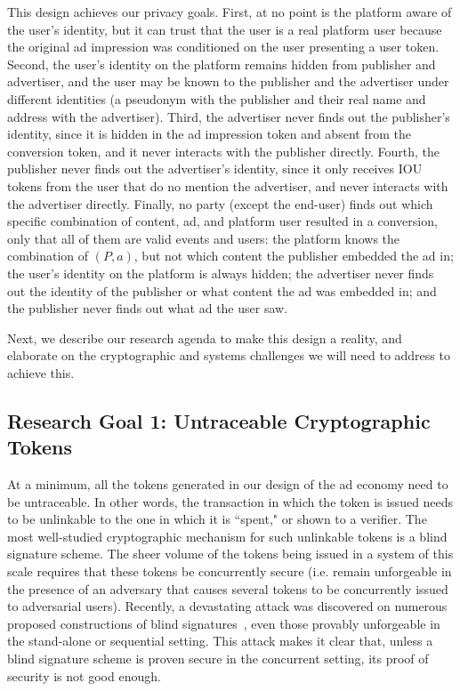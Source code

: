 %
This design achieves our privacy goals.
%
First, at no point is the platform aware of the user's identity, but it can trust that the user is a real platform user because the original ad impression was conditioned on the user presenting a user token.
%
Second, the user's identity on the platform remains hidden from publisher and advertiser, and the user may be known to the publisher and the advertiser under different identities (\eg a pseudonym with the publisher and their real name and address with the advertiser).
%
Third, the advertiser never finds out the publisher's identity, since it is hidden in the ad impression token and absent from the conversion token, and it never interacts with the publisher directly.
%
Fourth, the publisher never finds out the advertiser's identity, since it only receives IOU tokens from the user that do no mention the advertiser, and never interacts with the advertiser directly.
%
Finally, no party (except the end-user) finds out which specific combination of content, ad, and platform user resulted in a conversion, only that all of them are valid events and users: the platform knows the combination of $(P, a)$, but not which content the publisher embedded the ad in; the user's identity on the platform is always hidden; the advertiser never finds out the identity of the publisher or what content the ad was embedded in; and the publisher never finds out what ad the user saw.
%

%
Next, we describe our research agenda to make this design a reality, and elaborate on the cryptographic and systems challenges we will need to address to achieve this.
%

\subsection{Research Goal 1: Untraceable Cryptographic Tokens}
\label{rg1}

At a minimum, all the tokens generated in our design of the ad economy need to be untraceable.  In other words, the transaction in which the token is issued needs to be unlinkable to the one in which it is ``spent," or shown to a verifier.  The most well-studied cryptographic mechanism for such unlinkable tokens is a blind signature scheme.  The sheer volume of the tokens being issued in a system of this scale requires that these tokens be concurrently secure (i.e. remain unforgeable in the presence of an adversary that causes several tokens to be concurrently issued to adversarial users). Recently, a devastating attack was discovered on numerous proposed constructions of blind signatures~\cite{}, even those provably unforgeable in the stand-alone or sequential setting.  This attack makes it clear that, unless a blind signature scheme is proven secure in the concurrent setting, its proof of security is not good enough.

